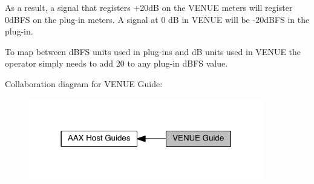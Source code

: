  As a result, a signal that registers +20d\+B on the V\+E\+N\+U\+E meters will register 0d\+B\+F\+S on the plug-\/in meters. A signal at 0 d\+B in V\+E\+N\+U\+E will be -\/20d\+B\+F\+S in the plug-\/in.

 To map between d\+B\+F\+S units used in plug-\/ins and d\+B units used in V\+E\+N\+U\+E the operator simply needs to add 20 to any plug-\/in d\+B\+F\+S value.

 Collaboration diagram for V\+E\+N\+U\+E Guide\+:
\nopagebreak
\begin{figure}[H]
\begin{center}
\leavevmode
\includegraphics[width=290pt]{a00377}
\end{center}
\end{figure}
